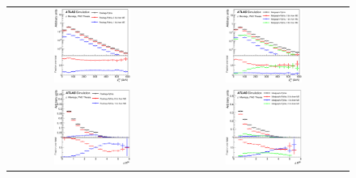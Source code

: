\begin{figure}[tp]
\centering
\begin{tabular}{cc}
  \includegraphics[width=0.47\textwidth]{Modeling/Figures/mepspp_tt2bq_qq_pt.eps} & 
  \includegraphics[width=0.47\textwidth]{Modeling/Figures/meps_tt2bq_qq_pt.eps} \\
  \includegraphics[width=0.47\textwidth]{Modeling/Figures/mepspp_tt2bq_qq_dr.eps} & 
  \includegraphics[width=0.47\textwidth]{Modeling/Figures/meps_tt2bq_qq_dr.eps} \\

\end{tabular}
\end{figure}
